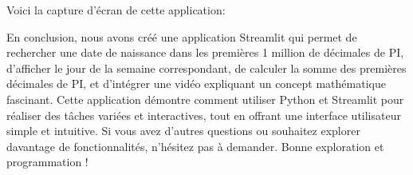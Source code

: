 \documentclass[a4paper,11pt]{article}
\begin{document}
        \newpage
        \noindent Voici la capture d'écran de cette application: 
        \begin{figure}[ht]
        \end{figure}

        \begin{tcolorbox}[colback=lightgray!6, colframe=black, left=5mm, right=5mm, top=2mm, bottom=2mm, boxrule=0.1mm]
            En conclusion, nous avons créé une application Streamlit qui permet de rechercher une date de naissance dans les premières 1 million de décimales de PI, d’afficher le jour de la semaine correspondant, de calculer la somme des premières décimales de PI, et d’intégrer une vidéo expliquant un concept mathématique fascinant.
            Cette application démontre comment utiliser Python et Streamlit pour réaliser des tâches variées et interactives, tout en offrant une interface utilisateur simple et intuitive. Si vous avez d’autres questions ou souhaitez explorer davantage de fonctionnalités, n’hésitez pas à demander. Bonne exploration et programmation !
        \end{tcolorbox}
    
\end{document}
